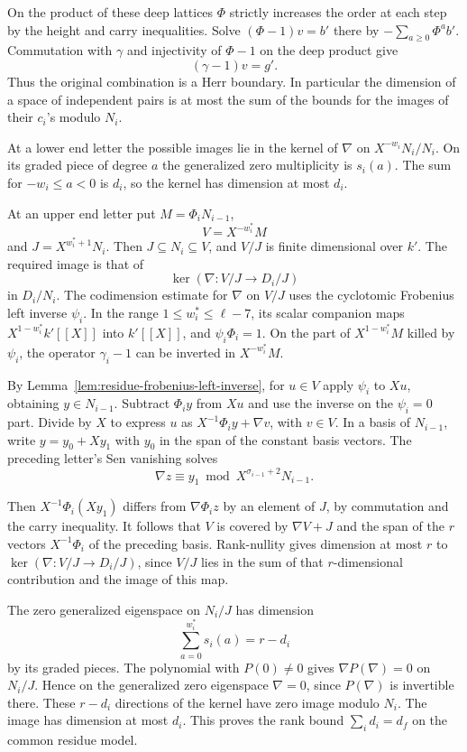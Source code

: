 On the product of these deep lattices
\(\Phi\) strictly increases the order at each step by the
height and carry inequalities. Solve \((\Phi-1)v=b'\) there
by \(-\sum_{a\ge0}\Phi^a b'\). Commutation with \(\gamma\)
and injectivity of \(\Phi-1\) on the deep product give
\[
 (\gamma-1)v=g'.
\]
Thus the original combination is a
Herr boundary. In particular the dimension of a space of
independent pairs is at most the sum of the bounds for the
images of their \(c_i\)'s modulo \(N_i\).

At a lower end letter the possible images lie in the kernel
of \(\nabla\) on \(X^{-w_i}N_i/N_i\).
On its graded piece of degree \(a\) the generalized zero
multiplicity is \(s_i(a)\). The sum for \(-w_i\le a<0\)
is \(d_i\), so the kernel has dimension at most \(d_i\).

At an upper end letter put \(M=\Phi_i N_{i-1}\),
\[
 V=X^{-w_i^*}M
\]
and \(J=X^{w_i^*+1}N_i\).
Then \(J\subseteq N_i\subseteq V\), and \(V/J\) is finite
dimensional over \(k'\). The required image is that of
\[
 \ker(\nabla:V/J\longrightarrow D_i/J)
\]
in \(D_i/N_i\).
The codimension estimate for \(\nabla\) on \(V/J\)
uses the cyclotomic Frobenius left inverse \(\psi_i\).
In the range \(1\le w_i^*\le\ell-7\), its scalar companion
maps \(X^{1-w_i^*}k'[[X]]\) into \(k'[[X]]\), and
\(\psi_i\Phi_i=1\). On the part of \(X^{1-w_i^*}M\) killed
by \(\psi_i\), the operator \(\gamma_i-1\) can be inverted
in \(X^{-w_i^*}M\).



By Lemma~\ref{lem:residue-frobenius-left-inverse}, for \(u\in V\) apply \(\psi_i\) to \(Xu\), obtaining
\(y\in N_{i-1}\). Subtract \(\Phi_i y\) from \(Xu\)
and use the inverse on the \(\psi_i=0\) part.
Divide by \(X\) to express \(u\) as
\(X^{-1}\Phi_i y+\nabla v\), with \(v\in V\).
In a basis of \(N_{i-1}\), write \(y=y_0+Xy_1\)
with \(y_0\) in the span of the constant basis vectors.
The preceding letter's Sen vanishing solves
\[
 \nabla z\equiv y_1\bmod X^{\sigma_{i-1}+2}N_{i-1}.
\]

Then \(X^{-1}\Phi_i(Xy_1)\) differs from
\(\nabla\Phi_i z\) by an element of \(J\), by commutation
and the carry inequality. It follows that \(V\) is covered
by \(\nabla V+J\) and the span of the \(r\) vectors
\(X^{-1}\Phi_i\) of the preceding basis.
Rank-nullity gives dimension at most \(r\) to
\(\ker(\nabla:V/J\to D_i/J)\), since \(V/J\) lies in the
sum of that \(r\)-dimensional contribution and the image
of this map.

The zero generalized eigenspace on \(N_i/J\) has dimension
\[
 \sum_{a=0}^{w_i^*}s_i(a)=r-d_i
\]
by its graded pieces.
The polynomial with \(P(0)\ne0\) gives
\(\nabla P(\nabla)=0\) on \(N_i/J\). Hence on the generalized
zero eigenspace \(\nabla=0\), since \(P(\nabla)\) is invertible
there. These \(r-d_i\) directions of the kernel have zero
image modulo \(N_i\). The image has dimension at most \(d_i\).
This proves the rank bound \(\sum_i d_i=d_f\) on the
common residue model.
\label{cor:residue-model-length-5}

